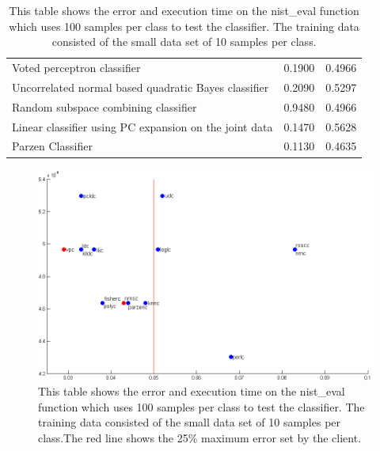 \documentclass[%
        compressed,
        final,
        notitlepage,
        narroweqnarray,
        inline,
        twoside,
        ]{ieee}
\begin{document}
\begin{table}
\begin{tabular} {p{5cm}lp{1.5cm}}
Voted perceptron classifier                                                 & 0.1900 & 0.4966 \\
Uncorrelated normal based quadratic Bayes classifier                        & 0.2090 & 0.5297 \\
Random subspace combining classifier                                        & 0.9480 & 0.4966 \\
Linear classifier using PC expansion on the joint data                      & 0.1470 & 0.5628 \\
Parzen Classifier                                                           & 0.1130 & 0.4635 \\
        \hline
    \end{tabular}
    \caption{
        This table shows the error and execution time on the nist\_eval function
        which uses 100 samples per class to test the classifier. The training
        data consisted of the small data set of 10 samples per class. }
\end{table}
\begin{figure}[] 
    \includegraphics[scale=0.385]{images/large_data_set_tested.png}

    \caption{ This table shows the error and execution time on the nist\_eval
    function which uses 100 samples per class to test the classifier. The
training data consisted of the small data set of 10 samples per class.The
        red line shows the 25\% maximum error set by the client. }
    \label{fig:test-large}
\end{figure}
\end{document}
